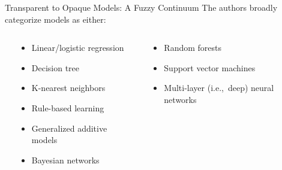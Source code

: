 \documentclass[11pt,dvipsnames,usenames,aspectratio=169]{beamer}  %
\begin{document}
\begin{frame}{Transparent to Opaque Models: A Fuzzy Continuum}{}
  The authors broadly categorize models as either:
    \begin{columns}[t]
      \begin{column}{0.025\textwidth}
      \end{column}
      \begin{column}{0.40\textwidth}
        \begin{center}
          \textbf{\large {}}
          \begin{itemize}
            \item Linear/logistic regression
            \item Decision tree
            \item K-nearest neighbors
            \item Rule-based learning
            \item Generalized additive models
            \item Bayesian networks
          \end{itemize}
        \end{center}
      \end{column}
      \begin{column}{0.05\textwidth}
      \end{column}
      \begin{column}{0.40\textwidth}
        \begin{center}
          \textbf{\large {}}
          \begin{itemize}
            \item Random forests
            \item Support vector machines
            \item Multi-layer (i.e.,~deep) neural networks
          \end{itemize}
        \end{center}
      \end{column}
      \begin{column}{0.025\textwidth}
      \end{column}
    \end{columns}

  \vspace{16pt}
\end{frame}
\end{document}

